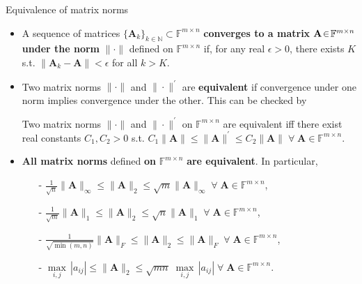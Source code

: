 \documentclass[t,usepdftitle=false]{beamer}
\begin{document}
\begin{frame}{Equivalence of matrix norms}
\begin{itemize} 
\item A sequence of matrices $\{\!\mathbf{A}_k\!\}_{k\in\mathbb{N}}\!\subset\!\mathbb{F}^{m\times n}\!$ \textbf{converges to a matrix} $\mathbf{A}\!\in\!\mathbb{F}^{m\times n}\hspace{-1cm}$ \textbf{under the norm} $\|\cdot\|$ defined on $\mathbb{F}^{m\times n}$ if, for any real $\epsilon>0$, there exists $K$ s.t. $\|\mathbf{A}_k-\mathbf{A}\|<\epsilon$ for all $k>K$.
\item Two matrix norms $\|\cdot\|$ and $\|\cdot\|^{\prime}$ are \textbf{equivalent} if convergence under one norm implies convergence under the other.
This can be checked by
\begin{theorem}
Two matrix norms  $\|\cdot\|$ and $\|\cdot\|^{\prime}$ on $\mathbb{F}^{m\times n}$ are equivalent iff there exist real constants $C_1,C_2>0$ s.t. $C_1\|\mathbf{A}\|\leq\|\mathbf{A}\|^{\prime}\leq C_2\|\mathbf{A}\|\;\forall\;\mathbf{A}\in\mathbb{F}^{m\times n}$.
\end{theorem}
\item \textbf{All matrix norms} defined \textbf{on} $\mathbb{F}^{m\times n}$ \textbf{are equivalent}.
In particular,\vspace{.2cm}\\
\hspace{2cm}\begin{minipage}{0.7\textwidth}
\begin{itemize}
\item[-] $\frac{1}{\sqrt{n}}\|\mathbf{A}\|_\infty\leq\|\mathbf{A}\|_2\leq\sqrt{m}\|\mathbf{A}\|_\infty\;\forall\;\mathbf{A}\in\mathbb{F}^{m\times n}$,\vspace{-.1cm}
\item[-] $\frac{1}{\sqrt{m}}\|\mathbf{A}\|_1\leq\|\mathbf{A}\|_2\leq\sqrt{n}\|\mathbf{A}\|_1\;\forall\;\mathbf{A}\in\mathbb{F}^{m\times n}$,\vspace{-.1cm}
\item[-] $\frac{1}{\sqrt{\min(m,n)}}\|\mathbf{A}\|_F\leq\|\mathbf{A}\|_2\leq\|\mathbf{A}\|_F\;\forall\;\mathbf{A}\in\mathbb{F}^{m\times n}$,\vspace{-.1cm}
\item[-] $\underset{i,j}{\max}\,|a_{ij}|\leq\|\mathbf{A}\|_2\leq\sqrt{mn}\;\underset{i,j}{\max}\,|a_{ij}|\;\forall\;\mathbf{A}\in\mathbb{F}^{m\times n}$.
\end{itemize}
\end{minipage}
\end{itemize}
\end{frame}
\end{document}
